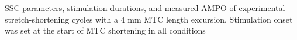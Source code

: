 \documentclass[
  11pt,
  a4paper]{article}
\begin{document}
\begin{supptbl}[H]

\caption{\label{supptbl-sscpa}SSC parameters, stimulation durations, and
measured AMPO of experimental stretch-shortening cycles with a 4 mm MTC
length excursion. Stimulation onset was set at the start of MTC
shortening in all conditions}

    

\end{supptbl}%
\end{document}
